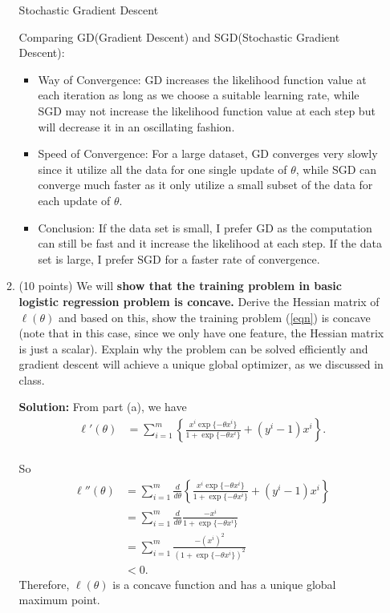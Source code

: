 \documentclass[twoside,10pt]{article}
\begin{document}
\begin{enumerate}
\begin{enumerate}
\begin{tcolorbox}
\begin{algorithm}[H]
 \caption{Stochastic Gradient Descent}
\end{algorithm}
\break
Comparing GD(Gradient Descent) and SGD(Stochastic Gradient Descent):
\begin{itemize}
\item Way of Convergence: GD increases the likelihood function value at each iteration as long as we choose a suitable learning rate,  while SGD may not increase the likelihood function value at each step but will decrease it in an oscillating fashion.
\item Speed of Convergence: For a large dataset, GD converges very slowly since it utilize all the data for one single update of $\theta$, while SGD can converge much faster as it only utilize a small subset of the data for each update of $\theta$.
\item Conclusion: If the data set is small, I prefer GD as the computation can still be fast and it increase the likelihood  at each step. If the data set is large, I prefer SGD for a faster rate of convergence.
\end{itemize}
\end{tcolorbox}

\item (10 points) We will {\bf show that the training problem in basic logistic regression problem is concave.} Derive the Hessian matrix of $\ell(\theta)$ and based on this, show the training problem (\ref{eqn}) is concave (note that in this case, since we only have one feature, the Hessian matrix is just a scalar). Explain why the problem can be solved efficiently and gradient descent will achieve a unique global optimizer, as we discussed in class. 
\begin{tcolorbox}
\textbf{Solution:} From part (a), we have
\begin{align*}
 \ell'(\theta)  &= \sum_{i=1}^m  \left\{ \frac{x^i\exp\{-\theta x^i\}} {1+\exp\{-\theta x^i\}} + (y^i-1)x^i\right\}.\\
\end{align*}
\end{tcolorbox}

\begin{tcolorbox}
So
\begin{align*}
 \ell''(\theta)  &= \sum_{i=1}^m \frac{d}{d\theta}  \left\{ \frac{x^i\exp\{-\theta x^i\}} {1+\exp\{-\theta x^i\}} + (y^i-1)x^i\right\}\\
 &= \sum_{i=1}^m \frac{d}{d\theta} \frac{-x^i} {1+\exp\{-\theta x^i\}} \\
 &=  \sum_{i=1}^m  \frac{-(x^i)^2} {(1+\exp\{-\theta x^i\})^2} \\
 &<0.
\end{align*}
Therefore, $\ell(\theta)$ is a concave function and has a unique global maximum point.
\end{tcolorbox}


\end{enumerate}
\end{enumerate}
\end{document}
